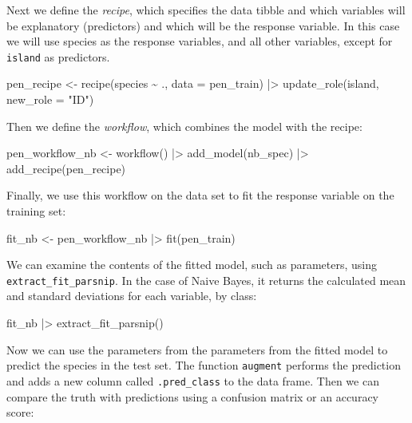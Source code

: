 \documentclass[
  letterpaper,
  DIV=11,
  numbers=noendperiod]{scrreprt}
\newenvironment{Shaded}{\begin{snugshade}}{\end{snugshade}}
\newcommand{\NormalTok}[1]{\textcolor[rgb]{0.00,0.23,0.31}{#1}}
\begin{document}
Next we define the \emph{recipe}, which specifies the data tibble and
which variables will be explanatory (predictors) and which will be the
response variable. In this case we will use species as the response
variables, and all other variables, except for \texttt{island} as
predictors.

\begin{Shaded}
\begin{Highlighting}[]
\NormalTok{pen\_recipe \textless{}{-} }
\NormalTok{  recipe(species \textasciitilde{} ., data = pen\_train) |\textgreater{} }
\NormalTok{  update\_role(island,  new\_role = "ID")}
\end{Highlighting}
\end{Shaded}

Then we define the \emph{workflow}, which combines the model with the
recipe:

\begin{Shaded}
\begin{Highlighting}[]
\NormalTok{pen\_workflow\_nb \textless{}{-} workflow() |\textgreater{}}
\NormalTok{  add\_model(nb\_spec) |\textgreater{}}
\NormalTok{  add\_recipe(pen\_recipe)}
\end{Highlighting}
\end{Shaded}

Finally, we use this workflow on the data set to fit the response
variable on the training set:

\begin{Shaded}
\begin{Highlighting}[]
\NormalTok{fit\_nb \textless{}{-} pen\_workflow\_nb |\textgreater{} fit(pen\_train)}
\end{Highlighting}
\end{Shaded}

We can examine the contents of the fitted model, such as parameters,
using \texttt{extract\_fit\_parsnip}. In the case of Naive Bayes, it
returns the calculated mean and standard deviations for each variable,
by class:

\begin{Shaded}
\begin{Highlighting}[]
\NormalTok{fit\_nb |\textgreater{} }
\NormalTok{  extract\_fit\_parsnip() }
\end{Highlighting}
\end{Shaded}

Now we can use the parameters from the parameters from the fitted model
to predict the species in the test set. The function \texttt{augment}
performs the prediction and adds a new column called
\texttt{.pred\_class} to the data frame. Then we can compare the truth
with predictions using a confusion matrix or an accuracy score:
\end{document}
